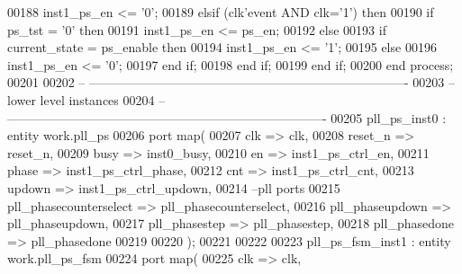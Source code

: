 \begin{DoxyCode}
00188          inst1\_ps\_en  <= '0';
00189       \textcolor{keywordflow}{elsif} \textcolor{vhdlchar}{(}\textcolor{vhdlchar}{clk}\textcolor{vhdlchar}{'}\textcolor{vhdlkeyword}{event} \textcolor{keywordflow}{AND} \textcolor{vhdlchar}{clk}\textcolor{vhdlchar}{=}\textcolor{vhdlchar}{'}\textcolor{vhdllogic}{}\textcolor{vhdllogic}{1}\textcolor{vhdlchar}{'}\textcolor{vhdlchar}{)} \textcolor{keywordflow}{then} 
00190          \textcolor{keywordflow}{if} \textcolor{vhdlchar}{ps_tst} \textcolor{vhdlchar}{=} \textcolor{vhdlchar}{'}\textcolor{vhdllogic}{}\textcolor{vhdllogic}{0}\textcolor{vhdlchar}{'} \textcolor{keywordflow}{then} 
00191             inst1\_ps\_en <= ps\_en;
00192          \textcolor{keywordflow}{else} 
00193             \textcolor{keywordflow}{if} \textcolor{vhdlchar}{current_state} \textcolor{vhdlchar}{=} \textcolor{vhdlchar}{ps\_enable} \textcolor{keywordflow}{then} 
00194                inst1\_ps\_en <= '1';
00195             \textcolor{keywordflow}{else} 
00196                inst1\_ps\_en <= '0';
00197             \textcolor{keywordflow}{end} \textcolor{keywordflow}{if};
00198          \textcolor{keywordflow}{end} \textcolor{keywordflow}{if};
00199       \textcolor{keywordflow}{end} \textcolor{keywordflow}{if};
00200    \textcolor{keywordflow}{end} \textcolor{keywordflow}{process};
00201 
00202 \textcolor{keyword}{-- ----------------------------------------------------------------------------}
00203 \textcolor{keyword}{-- lower level instances}
00204 \textcolor{keyword}{-- ----------------------------------------------------------------------------   }
00205 pll\_ps\_inst0 : \textcolor{keywordflow}{entity} work.pll_ps
00206    \textcolor{keywordflow}{port} \textcolor{keywordflow}{map}(
00207       clk                     => clk,
00208       reset_n                 => reset_n,
00209       busy                    => inst0_busy,
00210       en                      => inst1_ps_ctrl_en,
00211       phase                   => inst1_ps_ctrl_phase,
00212       cnt                     => inst1_ps_ctrl_cnt,
00213       updown                  => inst1_ps_ctrl_updown,    
00214 \textcolor{keyword}{      --pll ports}
00215       pll_phasecounterselect  => pll_phasecounterselect,
00216       pll_phaseupdown         => pll_phaseupdown,
00217       pll_phasestep           => pll_phasestep,
00218       pll_phasedone           => pll_phasedone
00219 
00220       \textcolor{vhdlchar}{)};
00221    
00222    
00223 pll\_ps\_fsm\_inst1 : \textcolor{keywordflow}{entity} work.pll_ps_fsm
00224    \textcolor{keywordflow}{port} \textcolor{keywordflow}{map}(
00225       clk               => clk,

\end{DoxyCode}
